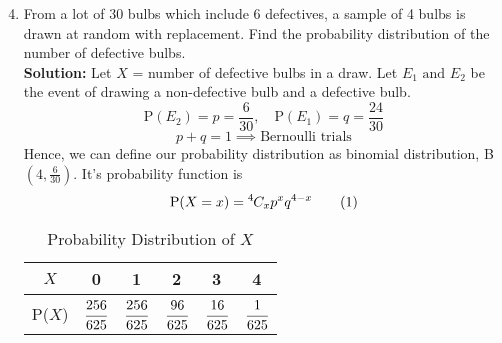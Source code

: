\documentclass[journal,12pt,twocolumn]{IEEEtran}
\providecommand{\brak}[1]{\ensuremath{\left(#1\right)}}
\newcommand{\solution}{\noindent \textbf{Solution: }}
\newcommand*{\permcomb}[4][0mu]{{{}^{#3}\mkern#1#2_{#4}}}
\newcommand*{\comb}[1][-1mu]{\permcomb[#1]{C}}
\newcommand\numberthis{\addtocounter{equation}{1}\tag{\theequation}}
\newcommand\T{\rule{0pt}{2.6ex}}       %
\begin{document}
\begin{enumerate}[label=13.\arabic{enumi}.\arabic{enumii}]
\setcounter{enumi}{3}
\setcounter{enumii}{6}
\item From a lot of 30 bulbs which include 6 defectives, a sample of 4 bulbs is drawn at random with replacement. Find the probability distribution of the number of defective bulbs.\\
	\solution
		Let $X$ = number of defective bulbs in a draw. Let $E_1 \text{ and } E_2$ be the event of drawing a non-defective bulb and a defective bulb.
		\[\text{P}(E_2)= p = \dfrac{6}{30}, \quad \text{P}(E_1)= q = \dfrac{24}{30}\]
		\[p+q=1 \implies \text{Bernoulli trials}\]
		Hence, we can define our probability distribution as binomial distribution, B$\brak{4,\frac{6}{30}}$. It's probability function is \[\text{P($X=x$)}=\comb{4}{x}p^xq^{4-x} \numberthis \]
	\begin{table}[h!]
	\normalsize
	\centering
		\begin{tabular}[20pt]{|>{}c|a|a|a|a|a|} \hline
			$X$&0&1&2&3&4 \T \\ \hline
			P($X$)&$\cfrac{256}{625}$&$\cfrac{256}{625}$&$\cfrac{96}{625}$&$\cfrac{16}{625}$&$\cfrac{1}{625}$\\[1.5ex] \hline
		\end{tabular}\\[2ex]
		\caption{Probability Distribution of $X$}
	\end{table}

\noindent{}

\end{enumerate}
\end{document}
